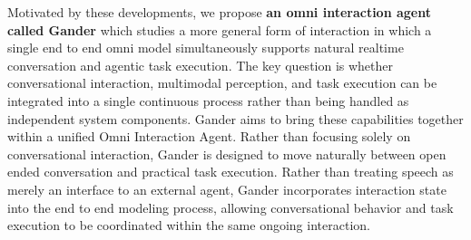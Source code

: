 Motivated by these developments, we propose \textbf{an omni interaction agent called Gander} which studies a more general form of interaction in which a single end to end omni model simultaneously supports natural realtime conversation and agentic task execution. The key question is whether conversational interaction, multimodal perception, and task execution can be integrated into a single continuous process rather than being handled as independent system components. Gander aims to bring these capabilities together within a unified Omni Interaction Agent. Rather than focusing solely on conversational interaction, Gander is designed to move naturally between open ended conversation and practical task execution. Rather than treating speech as merely an interface to an external agent, Gander incorporates interaction state into the end to end modeling process, allowing conversational behavior and task execution to be coordinated within the same ongoing interaction.

